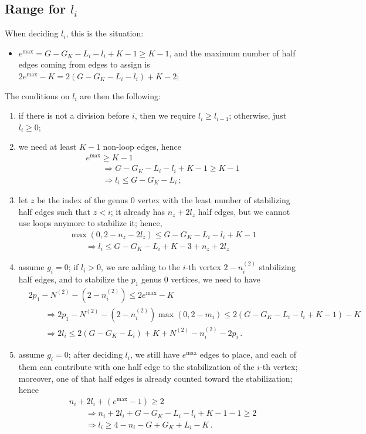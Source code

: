 \documentclass{amsart}
\theoremstyle{plain}
\theoremstyle{definition}
\DeclareMathOperator{\MAX}{max}
\begin{document}
\subsection{Range for $l_i$}

When deciding $l_{i}$, this is the situation:
\begin{itemize}
\item $e^{\MAX} = G - G_K - L_i - l_i + K - 1 \geq K-1$, and the
  maximum number of half edges coming from edges to assign is
  $2e^{\MAX} - K = 2(G - G_K - L_i - l_i) + K - 2$;
\end{itemize}

The conditions on $l_i$ are then the following:
\begin{enumerate}
\item if there is not a division before $i$, then we require $l_i \geq
  l_{i-1}$; otherwise, just $l_i \geq 0$;
\item we need at least $K-1$ non-loop edges, hence
  \begin{align*}
    &e^{\MAX} \geq K-1\\
    &\qquad\Rightarrow G - G_K - L_i - l_i + K-1 \geq K-1\\
    &\qquad\Rightarrow l_i \leq G - G_K - L_i\,\text{;}
  \end{align*}
\item let $z$ be the index of the genus $0$ vertex with the least
  number of stabilizing half edges such that $z < i$; it already has
  $n_z + 2l_z$ half edges, but we cannot use loops anymore to
  stabilize it; hence,
  \begin{align*}
    &\max(0, 2-n_z-2l_z) \leq G - G_K - L_i - l_i + K - 1\\
    &\qquad\Rightarrow l_i \leq G - G_K - L_i + K - 3 + n_z + 2l_z
  \end{align*}
\item assume $g_i = 0$; if $l_i > 0$, we are adding to the $i$-th
  vertex $2-n^{(2)}_i$ stabilizing half edges, and to stabilize the
  $p_1$ genus $0$ vertices, we need to have
  \begin{align*}
    &2 p_1 - N^{(2)} - (2-n^{(2)}_i) \leq 2e^{\MAX} - K\\
    &\qquad\Rightarrow 2p_1 - N^{(2)} - (2-n^{(2)}_i) \max(0, 2-m_i) \leq 2(G - G_K - L_i - l_i + K - 1) - K\\
    &\qquad\Rightarrow 2l_i \leq 2(G - G_K - L_i) + K + N^{(2)} - n^{(2)}_i - 2p_i\,\text{.}
  \end{align*}
\item assume $g_i = 0$; after deciding $l_i$, we still have $e^{\MAX}$
  edges to place, and each of them can contribute with one half edge
  to the stabilization of the $i$-th vertex; moreover, one of that
  half edges is already counted toward the stabilization; hence
  \begin{align*}
    &n_i + 2l_i + (e^{\MAX} - 1) \geq 2\\
    &\qquad\Rightarrow n_i + 2l_i + G - G_K - L_i - l_i + K - 1 - 1 \geq 2\\
    &\qquad\Rightarrow l_i \geq 4 - n_i - G + G_K + L_i - K\,\text{.}
  \end{align*}
\end{enumerate}
\end{document}

